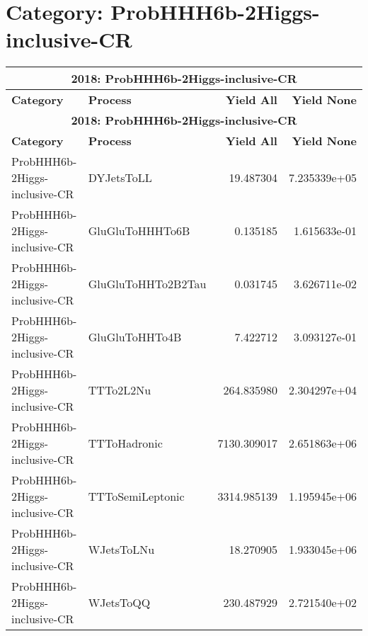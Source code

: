 \documentclass{article}
\begin{document}
\section*{Category: ProbHHH6b-2Higgs-inclusive-CR}
\begin{longtable}[c]{|l|l|r|r|}
\hline
\multicolumn{4}{|c|}{\textbf{2018: ProbHHH6b-2Higgs-inclusive-CR}} \\
\hline
\textbf{Category} & \textbf{Process} & \textbf{Yield All} & \textbf{Yield None} \\
\hline
\endfirsthead
\hline
\multicolumn{4}{|c|}{\textbf{2018: ProbHHH6b-2Higgs-inclusive-CR}} \\
\hline
\textbf{Category} & \textbf{Process} & \textbf{Yield All} & \textbf{Yield None} \\
\hline
\endhead
ProbHHH6b-2Higgs-inclusive-CR & DYJetsToLL & 19.487304 & 7.235339e+05 \\
\hline
ProbHHH6b-2Higgs-inclusive-CR & GluGluToHHHTo6B & 0.135185 & 1.615633e-01 \\
\hline
ProbHHH6b-2Higgs-inclusive-CR & GluGluToHHTo2B2Tau & 0.031745 & 3.626711e-02 \\
\hline
ProbHHH6b-2Higgs-inclusive-CR & GluGluToHHTo4B & 7.422712 & 3.093127e-01 \\
\hline
ProbHHH6b-2Higgs-inclusive-CR & TTTo2L2Nu & 264.835980 & 2.304297e+04 \\
\hline
ProbHHH6b-2Higgs-inclusive-CR & TTToHadronic & 7130.309017 & 2.651863e+06 \\
\hline
ProbHHH6b-2Higgs-inclusive-CR & TTToSemiLeptonic & 3314.985139 & 1.195945e+06 \\
\hline
ProbHHH6b-2Higgs-inclusive-CR & WJetsToLNu & 18.270905 & 1.933045e+06 \\
\hline
ProbHHH6b-2Higgs-inclusive-CR & WJetsToQQ & 230.487929 & 2.721540e+02 \\
\hline
\end{longtable}
\end{document}
